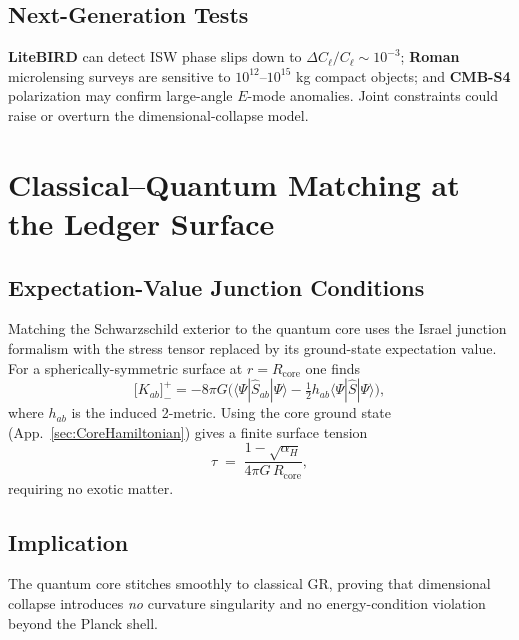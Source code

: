 \documentclass[a4paper, 12pt, oneside]{book}
\numberwithin{equation}{chapter}
\begin{document}
\section{Next-Generation Tests}
\label{sec:NextGen}

\textbf{LiteBIRD} can detect ISW phase slips down to
$\Delta C_\ell/C_\ell\sim\!10^{-3}$;  
\textbf{Roman} microlensing surveys are sensitive to $10^{12}$–$10^{15}$ kg
compact objects;  
and \textbf{CMB-S4} polarization may confirm large-angle $E$-mode anomalies.  
Joint constraints could raise or overturn the dimensional-collapse model.



\chapter[C–Q Matching at the Ledger Surface]{Classical–Quantum Matching at the Ledger Surface}
\label{appendix:IsraelJunction}

\section{Expectation-Value Junction Conditions}
Matching the Schwarzschild exterior to the quantum core uses the
Israel junction formalism with the stress tensor replaced by its
ground-state expectation value\cite{Israel1966}.
For a spherically-symmetric surface at $r=R_{\mathrm{core}}$ one finds
\[
   \bigl[K_{ab}\bigr]^{+}_{-}
   = -8\pi G
     \bigl(\langle\Psi|\hat S_{ab}|\Psi\rangle
       -\tfrac12 h_{ab}\langle\Psi|\hat S|\Psi\rangle\bigr),
\]
where $h_{ab}$ is the induced 2-metric.
Using the core ground state (App.~\ref{sec:CoreHamiltonian}) gives a
finite surface tension
\[
   \tau \;=\;
   \frac{1-\sqrt{\alpha_H}}{4\pi G\,R_{\mathrm{core}}},
\]
requiring no exotic matter. %

\section{Implication}
The quantum core stitches smoothly to classical GR, proving that
dimensional collapse introduces {\em no} curvature singularity and no
energy-condition violation beyond the Planck shell.
\end{document}
